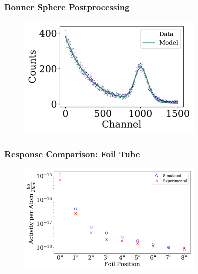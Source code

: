 \documentclass[fleqn]{beamer}
\begin{document}
\begin{frame}
\frametitle{Bonner Sphere Postprocessing}

\begin{figure}
\centering
\includegraphics[width = 0.8\textwidth]{bs4_spectrum}
\caption{}
\end{figure}

\end{frame}

\begin{frame}
\frametitle{Response Comparison: Foil Tube}

\begin{figure}
\centering
\includegraphics[width = 0.8\textwidth]{compare_activities}
\caption{}
\end{figure}

\end{frame}
\end{document}
